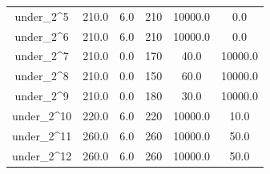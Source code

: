 \documentclass[a4paper,11pt]{article}
\begin{document}
\begin{longtable}{cccccc}
under\_2\textasciicircum{}5 & 210.0 & 6.0 & 210 & 10000.0 & 0.0\\
under\_2\textasciicircum{}6 & 210.0 & 6.0 & 210 & 10000.0 & 0.0\\
\addlinespace
under\_2\textasciicircum{}7 & 210.0 & 0.0 & 170 & 40.0 & 10000.0\\
under\_2\textasciicircum{}8 & 210.0 & 0.0 & 150 & 60.0 & 10000.0\\
under\_2\textasciicircum{}9 & 210.0 & 0.0 & 180 & 30.0 & 10000.0\\
under\_2\textasciicircum{}10 & 220.0 & 6.0 & 220 & 10000.0 & 10.0\\
under\_2\textasciicircum{}11 & 260.0 & 6.0 & 260 & 10000.0 & 50.0\\
\addlinespace
under\_2\textasciicircum{}12 & 260.0 & 6.0 & 260 & 10000.0 & 50.0\\*
\end{longtable}
\endgroup{}
\end{document}
